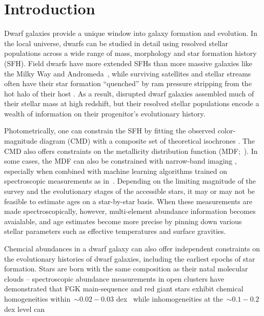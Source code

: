 \documentclass[ms.tex]{subfiles}
\begin{document}
\section{Introduction}
\label{sec:intro}

Dwarf galaxies provide a unique window into galaxy formation and evolution.
In the local universe, dwarfs can be studied in detail using resolved stellar
populations across a wide range of mass, morphology and star formation history
(SFH).
Field dwarfs have more extended SFHs than more massive galaxies like the Milky
Way and Andromeda~\citep[e.g.,][]{Behroozi2019, GarrisonKimmel2019}, while
surviving satellites and stellar streams often have their star formation
``quenched'' by ram pressure stripping from the hot halo of their host
\citep*[see discussion in, e.g.,][]{Steyrleithner2020}.
As a result, disrupted dwarf galaxies assembled much of their stellar mass at
high redshift, but their resolved stellar populations encode a wealth of
information on their progenitor's evolutionary history.
\par
Photometrically, one can constrain the SFH by fitting the observed
color-magnitude diagram (CMD) with a composite set of theoretical isochrones
\citep[e.g.,][]{Dolphin2002, Weisz2014b}.
The CMD also offers constraints on the metallicity distribution function
(MDF;~\citealp*[e.g.,][]{Lianou2011}).
In some cases, the MDF can also be constrained with narrow-band imaging
\citep{Fu2022}, especially when combined with machine learning algorithms
trained on spectroscopic measurements as in~\citet{Whitten2011}.
Depending on the limiting magnitude of the survey and the evolutionary stages
of the accessible stars, it may or may not be feasible to estimate ages on a
star-by-star basis.
When these measurements are made spectroscopically, however, multi-element
abundance information becomes avaialable, and age estimates become more precise
by pinning down various stellar parameters such as effective temperatures and
surface gravities.
\par
Chemcial abundances in a dwarf galaxy can also offer independent constraints
on the evolutionary histories of dwarf galaxies, including the earliest epochs
of star formation.
Stars are born with the same composition as their natal molecular clouds --
spectroscopic abundance measurements in open clusters have demonstrated that
FGK main-sequence and red giant stars exhibit chemical homogeneities
within~$\sim$$0.02 - 0.03$ dex~\citep{DeSilva2006, Bovy2016, Liu2016b,
Casamiquela2020} while inhomogeneities at the~$\sim$$0.1 - 0.2$ dex level can
\end{document}
